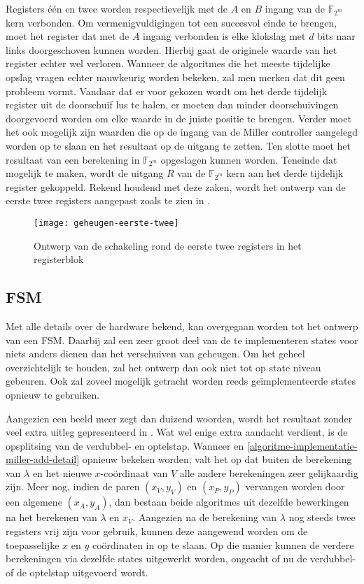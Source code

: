 Registers \'e\'en en twee worden respectievelijk met de $A$ en $B$ ingang van de $\mathbb{F}_{2^m}$ kern verbonden. Om vermenigvuldigingen tot een succesvol einde te brengen, moet het register dat met de $A$ ingang verbonden is elke klokslag met $d$ bits naar links doorgeschoven kunnen worden. Hierbij gaat de originele waarde van het register echter wel verloren. Wanneer de algoritmes die het meeste tijdelijke opslag vragen echter nauwkeurig worden bekeken, zal men merken dat dit geen probleem vormt. Vandaar dat er voor gekozen wordt om het derde tijdelijk register uit de doorschuif lus te halen, er moeten dan minder doorschuivingen doorgevoerd worden om elke waarde in de juiste positie te brengen. Verder moet het ook mogelijk zijn waarden die op de ingang van de Miller controller aangelegd worden op te slaan en het resultaat op de uitgang te zetten. Ten slotte moet het resultaat van een berekening in $\mathbb{F}_{2^m}$ opgeslagen kunnen worden. Teneinde dat mogelijk te maken, wordt de uitgang $R$ van de $\mathbb{F}_{2^m}$ kern aan het derde tijdelijk register gekoppeld. Rekend houdend met deze zaken, wordt het ontwerp van de eerste twee registers aangepast zoals te zien in .

\begin{figure}[h]
	\centering
		\texttt{[image: geheugen-eerste-twee]}
		\caption{Ontwerp van de schakeling rond de eerste twee registers in het registerblok\label{figuur-implementatie-geheugen-eerste-twee}}
\end{figure}

\subsection{FSM}

Met alle details over de hardware bekend, kan overgegaan worden tot het ontwerp van een FSM. Daarbij zal een zeer groot deel van de te implementeren states voor niets anders dienen dan het verschuiven van geheugen. Om het geheel overzichtelijk te houden, zal het ontwerp dan ook niet tot op state niveau gebeuren. Ook zal zoveel mogelijk getracht worden reeds ge\"implementeerde states opnieuw te gebruiken.

Aangezien een beeld meer zegt dan duizend woorden, wordt het resultaat zonder veel extra uitleg gepresenteerd in . Wat wel enige extra aandacht verdient, is de opsplitsing van de verdubbel- en optelstap. Wanneer  en \ref{algoritme-implementatie-miller-add-detail} opnieuw bekeken worden, valt het op dat buiten de berekening van $\lambda$ en het nieuwe $x$-co\"ordinaat van $V$ alle andere berekeningen zeer gelijkaardig zijn. Meer nog, indien de paren $(x_V, y_V)$ en $(x_P, y_P)$ vervangen worden door een algemene $(x_A, y_A)$, dan bestaan beide algoritmes uit dezelfde bewerkingen na het berekenen van $\lambda$ en $x_V$. Aangezien na de berekening van $\lambda$ nog steeds twee registers vrij zijn voor gebruik, kunnen deze aangewend worden om de toepasselijke $x$ en $y$ co\"ordinaten in op te slaan. Op die manier kunnen de verdere berekeningen via dezelfde states uitgewerkt worden, ongeacht of nu de verdubbel- of de optelstap uitgevoerd wordt.

